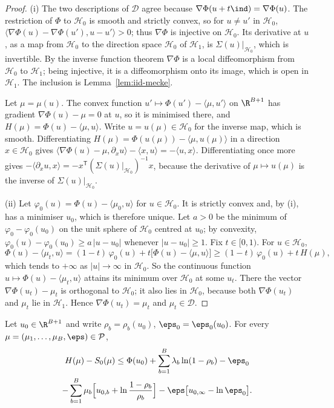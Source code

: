 \begin{proof}
(i) The two descriptions of $\mathcal{D}$ agree because $\nabla\Phi(u+t\ind)=\nabla\Phi(u)$.
The restriction of $\Phi$ to $\mathcal{H}_0$ is smooth and strictly convex, so for
$u\ne u'$ in $\mathcal{H}_0$,
$\langle\nabla\Phi(u)-\nabla\Phi(u'),u-u'\rangle>0$; thus $\nabla\Phi$ is injective on
$\mathcal{H}_0$. Its derivative at $u$, as a map from $\mathcal{H}_0$ to the direction
space $\mathcal{H}_0$ of $\mathcal{H}_1$, is $\Sigma(u)|_{\mathcal{H}_0}$, which is
invertible. By the inverse function theorem $\nabla\Phi$ is a local diffeomorphism from
$\mathcal{H}_0$ to $\mathcal{H}_1$; being injective, it is a diffeomorphism onto its
image, which is open in $\mathcal{H}_1$. The inclusion is Lemma~\ref{lem:iid-mecke}.

Let $\mu=\mu(u)$. The convex function $u'\mapsto\Phi(u')-\langle\mu,u'\rangle$ on
$\R^{B+1}$ has gradient $\nabla\Phi(u)-\mu=0$ at $u$, so it is minimised there, and
$H(\mu)=\Phi(u)-\langle\mu,u\rangle$. Write $u=u(\mu)\in\mathcal{H}_0$ for the inverse
map, which is smooth. Differentiating $H(\mu)=\Phi(u(\mu))-\langle\mu,u(\mu)\rangle$ in a
direction $x\in\mathcal{H}_0$ gives
$\langle\nabla\Phi(u)-\mu,\partial_xu\rangle-\langle x,u\rangle=-\langle u,x\rangle$.
Differentiating once more gives $-\langle\partial_xu,x\rangle
=-x^{\mathsf T}(\Sigma(u)|_{\mathcal{H}_0})^{-1}x$, because the derivative of
$\mu\mapsto u(\mu)$ is the inverse of $\Sigma(u)|_{\mathcal{H}_0}$.

(ii) Let $\varphi_0(u)=\Phi(u)-\langle\mu_0,u\rangle$ for $u\in\mathcal{H}_0$. It is
strictly convex and, by (i), has a minimiser $u_0$, which is therefore unique. Let
$a>0$ be the minimum of $\varphi_0-\varphi_0(u_0)$ on the unit sphere of $\mathcal{H}_0$
centred at $u_0$; by convexity, $\varphi_0(u)-\varphi_0(u_0)\ge a\,|u-u_0|$ whenever
$|u-u_0|\ge1$. Fix $t\in[0,1)$. For $u\in\mathcal{H}_0$,
\[
\Phi(u)-\langle\mu_t,u\rangle=(1-t)\,\varphi_0(u)+t\bigl[\Phi(u)-\langle\mu,u\rangle\bigr]
\ge(1-t)\,\varphi_0(u)+t\,H(\mu),
\]
which tends to $+\infty$ as $|u|\to\infty$ in $\mathcal{H}_0$. So the continuous function
$u\mapsto\Phi(u)-\langle\mu_t,u\rangle$ attains its minimum over $\mathcal{H}_0$ at some
$u_t$. There the vector $\nabla\Phi(u_t)-\mu_t$ is orthogonal to $\mathcal{H}_0$; it also
lies in $\mathcal{H}_0$, because both $\nabla\Phi(u_t)$ and $\mu_t$ lie in $\mathcal{H}_1$.
Hence $\nabla\Phi(u_t)=\mu_t$ and $\mu_t\in\mathcal{D}$.
\end{proof}

\begin{proposition}\label{prop:iid-tangent}
Let $u_0\in\R^{B+1}$ and write $\rho_b=\rho_b(u_0)$, $\eps_0=\eps_0(u_0)$. For every
$\mu=(\mu_1,\dots,\mu_B,\eps)\in\mathcal{P}$,
\begin{multline}\label{eq:iid-tangent}
H(\mu)-S_0(\mu)\le\Phi(u_0)+\sum_{b=1}^B\lambda_b\ln(1-\rho_b)-\eps_0\\
-\sum_{b=1}^B\mu_b\Bigl[u_{0,b}+\ln\frac{1-\rho_b}{\rho_b}\Bigr]
-\eps\bigl[u_{0,\infty}-\ln\eps_0\bigr].
\end{multline}
\end{proposition}

